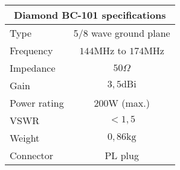 \footnotesize
\begin{tabular}{|l|c|}
	\hline
	\multicolumn{2}{|c|}{\textbf{Diamond BC-101 specifications}} \\
	\hline
 	Type & 5/8 wave ground plane \\
 	Frequency & $144\mathrm{MHz}$ to $174\mathrm{MHz}$ \\
	Impedance & $50\Omega$\\
	Gain & $3,5\mathrm{dBi}$\\
 	Power rating & $200\mathrm{W}$ (max.) \\
 	VSWR & $< 1,5$ \\
	Weight & $0,86\mathrm{kg}$ \\
	Connector & PL plug \\
	\hline
\end{tabular}